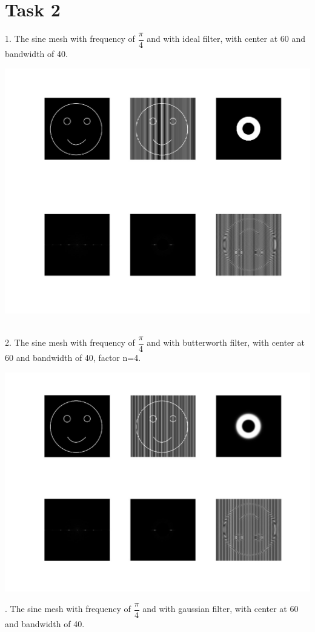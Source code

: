 \documentclass[a4paper]{article}
\begin{document}
\section{Task 2}
1. The sine mesh with frequency of $\dfrac{\pi}{4}$ and with ideal filter, with center at 60 and bandwidth of 40.\\
\centerline{\includegraphics[scale=0.30]{7.jpg}}\\
2. The sine mesh with frequency of $\dfrac{\pi}{4}$ and with butterworth filter, with center at 60 and bandwidth of 40, factor n=4.\\
\centerline{\includegraphics[scale=0.30]{8.jpg}}
. The sine mesh with frequency of $\dfrac{\pi}{4}$ and with gaussian filter, with center at 60 and bandwidth of 40.\\
\end{document}
